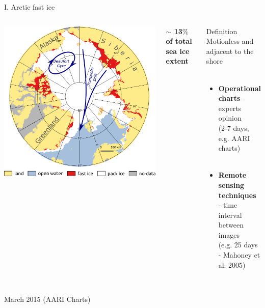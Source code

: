 \documentclass[8pt]{beamer}
\newcommand\Fontvi{\fontsize{6}{7.2}\selectfont}
\begin{document}
\setwatermark{\fontsize{125pt}{125pt}\selectfont{}}
\begin{frame}[fragile]{I. Arctic fast ice}
	\begin{columns}
		\includegraphics[width=1\textwidth]{./img/ArcticSI_Mar2015_FI_circ_names.pdf}\\
				\begin{block}{\centering}
					\begin{center}
						\textbf{$\sim$ 13$\%$ of total sea ice extent}
					\end{center}
				\end{block}
				
				\begin{block}{\centering Definition}
					\centering
				Motionless and adjacent to the shore\\~\\
					\begin{itemize}
						\item \textbf{Operational charts} - experts opinion\\
						 (2-7 days, e.g. AARI charts)\\~\\
						\item \textbf{Remote sensing techniques}\\ - time interval between images\\
						 (e.g. 25 days - Mahoney et al. 2005)
					\end{itemize}
				\end{block}

	\end{columns}
~\\
\Fontvi
17 March 2015 (AARI Charts)
\end{frame}
\end{document}
